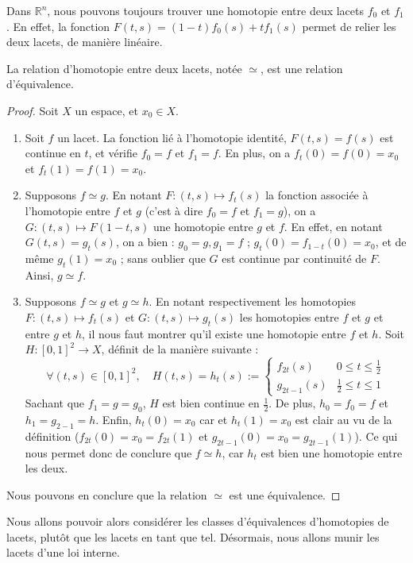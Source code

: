 \documentclass[hidelinks, 10pt]{article}
\begin{document}
\begin{exemple}
Dans $\mathbb{R}^n$, nous pouvons toujours trouver une homotopie entre deux lacets $f_0$ et $f_1$. En effet, la fonction $F(t,s)=(1-t)f_0(s)+tf_1(s)$ permet de relier les deux lacets, de manière linéaire.
\end{exemple}

\begin{proposition}
La relation d'homotopie entre deux lacets, notée $\simeq$, est une relation d'équivalence.
\end{proposition}
\begin{proof}
Soit $X$ un espace, et $x_0\in X$.\begin{enumerate}
    \item Soit $f$ un lacet. La fonction lié à l'homotopie identité, $F(t,s)=f(s)$ est continue en $t$, et vérifie $f_0=f$ et $f_1=f$. En plus, on a $f_t(0)=f(0)=x_0$ et $f_t(1)=f(1)=x_0$.
    \item Supposons $f\simeq g$. En notant $F:(t,s)\mapsto f_t(s)$ la fonction associée à l'homotopie entre $f$ et $g$ (c'est à dire $f_0=f$ et $f_1=g$), on a $G:(t,s)\mapsto F(1-t,s)$ une homotopie entre $g$ et $f$. En effet, en notant $G(t,s)=g_t(s)$, on a bien : $g_0=g,g_1=f$ ; $g_t(0)=f_{1-t}(0)=x_0$, et de même $g_t(1)=x_0$ ; sans oublier que $G$ est continue par continuité de $F$. Ainsi, $g\simeq f$.
    \item Supposons $f\simeq g$ et $g\simeq h$. En notant respectivement les homotopies $F:(t,s)\mapsto f_t(s)$ et $G:(t,s)\mapsto g_t(s)$ les homotopies entre $f$ et $g$ et entre $g$ et $h$, il nous faut montrer qu'il existe une homotopie entre $f$ et $h$. Soit $H:[0,1]^2\rightarrow X$, définit de la manière suivante : \[\forall (t,s)\in[0,1]^2,\quad H(t,s)=h_t(s):=\left\{\begin{matrix}
f_{2t}(s)&0\leq t\leq \frac{1}{2}\\ 
g_{2t-1}(s)&\frac{1}{2}\leq t\leq 1
\end{matrix}\right.\]Sachant que $f_1=g=g_0$, $H$ est bien continue en $\frac{1}{2}$. De plus, $h_0=f_0=f$ et $h_1=g_{2-1}=h$. Enfin, $h_t(0)=x_0$ car et $h_t(1)=x_0$ est clair au vu de la définition ($f_{2t}(0)=x_0=f_{2t}(1)$ et $g_{2t-1}(0)=x_0=g_{2t-1}(1)$). Ce qui nous permet donc de conclure que $f\simeq h$, car $h_t$ est bien une homotopie entre les deux.
\end{enumerate}
Nous pouvons en conclure que la relation $\simeq$ est une équivalence.
\end{proof}

Nous allons pouvoir alors considérer les classes d'équivalences d'homotopies de lacets, plutôt que les lacets en tant que tel. Désormais, nous allons munir les lacets d'une loi interne.
\end{document}
